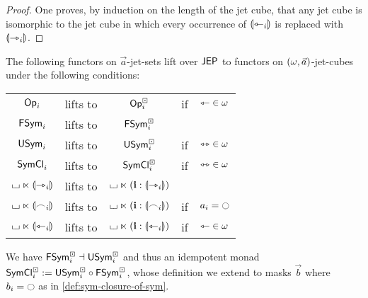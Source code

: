 \documentclass[a4paper]{memoir}
\begin{document}
\begin{proof}
	One proves, by induction on the length of the jet cube, that any jet cube is isomorphic to the jet cube in which every occurrence of ${\llparenthesis \leftarrowtriangle_i \rrparenthesis}$ is replaced with ${\llparenthesis \rightarrowtriangle_i \rrparenthesis}$.
\end{proof}
\begin{proposition} \label{thm:lift-to-jet-cubes}
	The following functors on $\vec a$-jet-sets lift over $\mathsf{JEP}$ to functors on $(\omega, \vec a)$-jet-cubes under the following conditions:
	\begin{center}
		\begin{tabular}{c c c c l}
			${\mathsf{Op}}_i$ & lifts to & ${\mathsf{Op}}^\boxdot_i$ & if & ${\leftarrowtriangle} \in \omega$ \\
			$\mathsf{FSym}_i$ & lifts to & $\mathsf{FSym}^\boxdot_i$ && \\
			$\mathsf{USym}_i$ & lifts to & $\mathsf{USym}^\boxdot_i$ & if & ${\leftrightarrowtriangle} \in \omega$ \\
			$\mathsf{SymCl}_i$ & lifts to & $\mathsf{SymCl}^\boxdot_i$ & if & ${\leftrightarrowtriangle} \in \omega$ \\
			${\llcorner\hspace{-.4ex}\lrcorner} \ltimes {\llparenthesis \rightarrowtriangle_i \rrparenthesis}$ & lifts to & ${\llcorner\hspace{-.4ex}\lrcorner} \ltimes (\mathbf{i} : {\llparenthesis \rightarrowtriangle_i \rrparenthesis})$ && \\
			${\llcorner\hspace{-.4ex}\lrcorner} \ltimes {\llparenthesis \frown_i \rrparenthesis}$ & lifts to & ${\llcorner\hspace{-.4ex}\lrcorner} \ltimes (\mathbf{i} : {\llparenthesis \frown_i \rrparenthesis})$ & if & $a_i = \npolar$ \\
			${\llcorner\hspace{-.4ex}\lrcorner} \ltimes {\llparenthesis \leftarrowtriangle_i \rrparenthesis}$ & lifts to & ${\llcorner\hspace{-.4ex}\lrcorner} \ltimes (\mathbf{i} : {\llparenthesis \leftarrowtriangle_i \rrparenthesis})$ & if & ${\leftarrowtriangle} \in \omega$ \\
		\end{tabular}
	\end{center}
	We have $\mathsf{FSym}^\boxdot_i \dashv \mathsf{USym}^\boxdot_i$ and thus an idempotent monad $\mathsf{SymCl}^\boxdot_i := \mathsf{USym}^\boxdot_i \circ \mathsf{FSym}^\boxdot_i$, whose definition we extend to masks $\vec b$ where $b_i = \npolar$ as in \cref{def:sym-closure-of-sym}.
\end{proposition}
\end{document}
